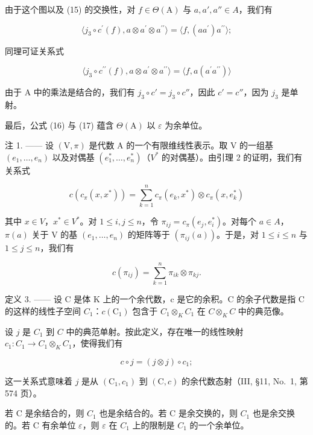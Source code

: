 由于这个图以及 (15) 的交换性，对 \(f \in \Theta(\mathrm{A})\) 与 \(a, a', a'' \in A\)，我们有

\[
\langle j _ {3} \circ c ^ {\prime} (f), a \otimes a ^ {\prime} \otimes a ^ {\prime \prime} \rangle = \langle f, (a a ^ {\prime}) a ^ {\prime \prime} \rangle ;
\]

同理可证关系式

\[
\langle j _ {3} \circ c ^ {\prime \prime} (f), a \otimes a ^ {\prime} \otimes a ^ {\prime \prime} \rangle = \langle f, a (a ^ {\prime} a ^ {\prime \prime}) \rangle
\]

由于 A 中的乘法是结合的，我们有 \(j_{3} \circ c' = j_{3} \circ c''\)，因此 \(c' = c''\)，因为 \(j_{3}\) 是单射。

最后，公式 (16) 与 (17) 蕴含 \(\Theta(\mathrm{A})\) 以 \(\varepsilon\) 为余单位。

注 1. —— 设 \((\mathrm{V},\pi)\) 是代数 A 的一个有限维线性表示。取 V 的一组基 \((e_{1},\ldots,e_{n})\) 以及对偶基 \((e_{1}^{*},\ldots,e_{n}^{*})\)（\(V^{*}\) 的对偶基）。由引理 2 的证明，我们有关系式

\[
c (c _ {\pi} (x, x ^ {*})) = \sum_ {k = 1} ^ {n} c _ {\pi} (e _ {k}, x ^ {*}) \otimes c _ {\pi} (x, e _ {k} ^ {*})\tag{19}
\]

其中 \(x \in V\)，\(x^{*} \in V^{*}\)。对 \(1 \leqslant i, j \leqslant n\)，令 \(\pi_{ij} = c_{\pi}(e_j, e_i^*)\)。对每个 \(a \in A\)，\(\pi(a)\) 关于 V 的基 \((e_1, \ldots, e_n)\) 的矩阵等于 \((\pi_{ij}(a))\)。于是，对 \(1 \leqslant i \leqslant n\) 与 \(1 \leqslant j \leqslant n\)，我们有

\[
c (\pi_ {i j}) = \sum_ {k = 1} ^ {n} \pi_ {i k} \otimes \pi_ {k j}.\tag{20}
\]

定义 3. —— 设 C 是体 K 上的一个余代数，c 是它的余积。C 的余子代数是指 C 的这样的线性子空间 \(C_{1}\)：\(c(\mathrm{C}_{1})\) 包含于 \(C_{1} \otimes_{K} C_{1}\) 在 \(C \otimes_{K} C\) 中的典范像。

设 \(j\) 是 \(C_1\) 到 \(C\) 中的典范单射。按此定义，存在唯一的线性映射 \(c_1: C_1 \to C_1 \otimes_K C_1\)，使得我们有

\[
c \circ j = (j \otimes j) \circ c _ {1};\tag{21}
\]

这一关系式意味着 \(j\) 是从 \((\mathrm{C}_1, c_1)\) 到 \((\mathrm{C}, c)\) 的余代数态射（III, §11, No.~1, 第 574 页）。

若 C 是余结合的，则 \(C_{1}\) 也是余结合的。若 C 是余交换的，则 \(C_{1}\) 也是余交换的。若 C 有余单位 \(\varepsilon\)，则 \(\varepsilon\) 在 \(C_{1}\) 上的限制是 \(C_{1}\) 的一个余单位。

